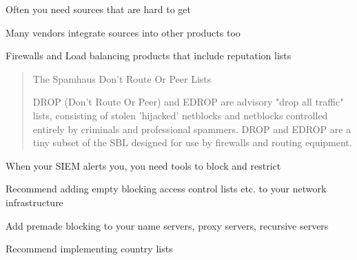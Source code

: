 \documentclass[Screen16to9,17pt]{foils}
\begin{document}
\begin{list2}
\item Often you need sources that are hard to get
\item Many vendors integrate sources into other products too
\item Firewalls and Load balancing products that include reputation lists
\end{list2}


\begin{quote}
The Spamhaus Don't Route Or Peer Lists

DROP (Don't Route Or Peer) and EDROP are advisory "drop all traffic" lists, consisting of stolen 'hijacked' netblocks and netblocks controlled entirely by criminals and professional spammers. DROP and EDROP are a tiny subset of the SBL designed for use by firewalls and routing equipment.
\end{quote}



\begin{list2}
\item When your SIEM alerts you, you need tools to block and restrict
\item Recommend adding empty blocking access control lists etc. to your network infrastructure
\item Add premade blocking to your name servers, proxy servers, recursive servers
\item Recommend implementing country lists
\end{list2}













\begin{list1}
\item
\end{list1}




\slidenext{}
\end{document}
